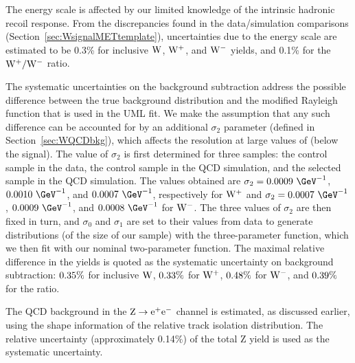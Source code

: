The \MET energy scale is affected by our limited knowledge of the intrinsic hadronic
recoil response. From the discrepancies found in the data/simulation
comparisons (Section~\ref{sec:WsignalMETtemplate}), uncertainties due to
the \MET energy scale are estimated to be 0.3\% for inclusive $\mathrm{W}$,
$\mathrm{W^+}$, and $\mathrm{W^-}$ yields, and 0.1\% for the $\mathrm{W^+}/\mathrm{W^-}$ ratio.

\par
The systematic uncertainties on the background subtraction
address the possible difference between the true background distribution
and the modified Rayleigh function that is used in the UML fit.
We make the assumption that any such difference can be accounted
for by an additional $\sigma_2$ parameter (defined in Section~\ref{sec:WQCDbkg}),
which affects the resolution at large values of \MET (below the signal).
The value of $\sigma_2$ is first determined for three samples: the control sample
in the data, the control sample in the QCD simulation, and the
selected sample in the QCD simulation. The values obtained are $\sigma_2=0.0009~\GeV^{-1}$,
$0.0010~\GeV^{-1}$, and $0.0007~\GeV^{-1}$, respectively for $\mathrm{W^+}$ and
$\sigma_2=0.0007~\GeV^{-1}$,
$0.0009~\GeV^{-1}$, and $0.0008~\GeV^{-1}$ for $\mathrm{W^-}$.
The three values of $\sigma_2$ are then fixed in turn, and $\sigma_0$ and $\sigma_1$
are set to their values from data to generate distributions (of the size
of our sample) with
the three-parameter function, which  we then fit with our nominal two-parameter
function. The maximal relative difference in the yields
is quoted as the systematic uncertainty on background subtraction: $ 0.35  \%$ for inclusive $\mathrm{W}$,
$ 0.33  \%$ for $\mathrm{W^+}$, $ 0.48  \%$ for $\mathrm{W^-}$, and $ 0.39  \%$ for the ratio.

\par


\par



The QCD background in the $\mathrm{Z} \rightarrow \mathrm{e}^+\mathrm{e}^-$ channel is estimated, as discussed earlier, 
using the shape information of the relative track isolation distribution. 
The relative uncertainty (approximately 0.14$\%$) of the 
total Z yield is used as the systematic uncertainty. 

